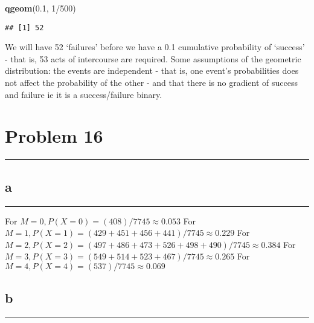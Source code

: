 \documentclass[]{tufte-handout}
\newenvironment{Shaded}{}{}
\newcommand{\DecValTok}[1]{\textcolor[rgb]{0.25,0.63,0.44}{#1}}
\newcommand{\FloatTok}[1]{\textcolor[rgb]{0.25,0.63,0.44}{#1}}
\newcommand{\KeywordTok}[1]{\textcolor[rgb]{0.00,0.44,0.13}{\textbf{#1}}}
\newcommand{\NormalTok}[1]{#1}
\newcommand{\OperatorTok}[1]{\textcolor[rgb]{0.40,0.40,0.40}{#1}}
\begin{document}
\begin{Shaded}
\begin{Highlighting}[]
\KeywordTok{qgeom}\NormalTok{(}\FloatTok{0.1}\NormalTok{, }\DecValTok{1}\OperatorTok{/}\DecValTok{500}\NormalTok{)}
\end{Highlighting}
\end{Shaded}

\begin{verbatim}
## [1] 52
\end{verbatim}

We will have 52 `failures' before we have a 0.1 cumulative probability
of `success' - that is, 53 acts of intercourse are required. Some
assumptions of the geometric distribution: the events are independent -
that is, one event's probabilities does not affect the probability of
the other - and that there is no gradient of success and failure ie it
is a success/failure binary.

\hypertarget{problem-16}{%
\section{Problem 16}\label{problem-16}}

\begin{center}\rule{0.5\linewidth}{0.5pt}\end{center}

\hypertarget{a-8}{%
\subsection{a}\label{a-8}}

\begin{center}\rule{0.5\linewidth}{0.5pt}\end{center}

For \(M = 0, P(X = 0) = (408)/7745 \approx 0.053\) For
\(M = 1, P(X = 1) = (429 + 451 + 456 + 441)/7745 \approx 0.229\) For
\(M = 2, P(X = 2) = (497+486+473+526+498+490)/7745 \approx 0.384\) For
\(M = 3, P(X = 3) = (549+514+523+467)/7745 \approx 0.265\) For
\(M = 4, P(X = 4) = (537)/7745 \approx 0.069\)

\hypertarget{b-8}{%
\subsection{b}\label{b-8}}

\begin{center}\rule{0.5\linewidth}{0.5pt}\end{center}
\end{document}
